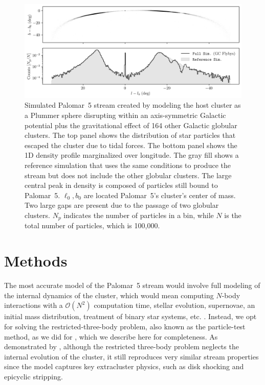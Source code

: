     \begin{figure}
        \centering
        \includegraphics[width=\linewidth]{images/stream_on_sky_Pal5_monte-carlo-009_pouliasis2017pii-GCNBody_pouliasis2017pii.png}
        \caption[Simulated Gap in the Palomar~5 stream from two Globular Clusters]{Simulated Palomar~5 stream created by modeling the host cluster as a Plummer sphere disrupting within an axis-symmetric Galactic potential plus the gravitational effect of 164 other Galactic globular clusters. The top panel shows the distribution of star particles that escaped the cluster due to tidal forces. The bottom panel shows the 1D density profile marginalized over longitude. The gray fill shows a reference simulation that uses the same conditions to produce the stream but does not include the other globular clusters. The large central peak in density is composed of particles still bound to Palomar~5. $\ell_0,b_0$ are located Palomar~5's cluster's center of mass. Two large gaps are present due to the passage of two globular clusters. $N_p$ indicates the number of particles in a bin, while $N$ is the total number of particles, which is 100,000.}
        \label{fig:stream_on_sky}
    \end{figure}

\section{Methods}
    The most accurate model of the Palomar~5 stream would involve full modeling of the internal dynamics of the cluster, which would mean computing $N$-body interactions with a $\mathcal{O}(N^2)$ computation time, stellar evolution, supernovae, an initial mass distribution, treatment of binary star systems, etc. \citep[for such an example, see][]{2021NatAs...5..957G, 2016MNRAS.458.1450W}. Instead, we opt for solving the restricted-three-body problem, also known as the particle-test method, as we did for \citet{2023A&A...673A..44F}, which we describe here for completeness. As demonstrated by \citet{2012A&A...546L...7M}, although the restricted three-body problem neglects the internal evolution of the cluster, it still reproduces very similar stream properties since the model captures key extracluster physics, such as disk shocking and epicyclic stripping.\\

